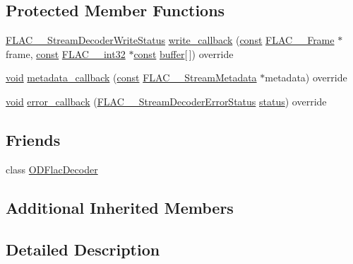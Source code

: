 \subsection*{Protected Member Functions}
\begin{DoxyCompactItemize}
\item 
\hyperlink{group__flac__stream__decoder_ga73f67eb9e0ab57945afe038751bc62c8}{F\+L\+A\+C\+\_\+\+\_\+\+Stream\+Decoder\+Write\+Status} \hyperlink{class_o_d_f_l_a_c_file_a0b7eb5afc2015504a9f57e60b9a57c54}{write\+\_\+callback} (\hyperlink{getopt1_8c_a2c212835823e3c54a8ab6d95c652660e}{const} \hyperlink{struct_f_l_a_c_____frame}{F\+L\+A\+C\+\_\+\+\_\+\+Frame} $\ast$frame, \hyperlink{getopt1_8c_a2c212835823e3c54a8ab6d95c652660e}{const} \hyperlink{ordinals_8h_a33fd77bfe6d685541a0c034a75deccdc}{F\+L\+A\+C\+\_\+\+\_\+int32} $\ast$\hyperlink{getopt1_8c_a2c212835823e3c54a8ab6d95c652660e}{const} \hyperlink{structbuffer}{buffer}\mbox{[}$\,$\mbox{]}) override
\item 
\hyperlink{sound_8c_ae35f5844602719cf66324f4de2a658b3}{void} \hyperlink{class_o_d_f_l_a_c_file_aeb1d1c6a1d3e8ffaf7f91eadd9b3445a}{metadata\+\_\+callback} (\hyperlink{getopt1_8c_a2c212835823e3c54a8ab6d95c652660e}{const} \hyperlink{struct_f_l_a_c_____stream_metadata}{F\+L\+A\+C\+\_\+\+\_\+\+Stream\+Metadata} $\ast$metadata) override
\item 
\hyperlink{sound_8c_ae35f5844602719cf66324f4de2a658b3}{void} \hyperlink{class_o_d_f_l_a_c_file_ae9691750596a13e9a325775612ddb8b6}{error\+\_\+callback} (\hyperlink{group__flac__stream__decoder_ga130e70bd9a73d3c2416247a3e5132ecf}{F\+L\+A\+C\+\_\+\+\_\+\+Stream\+Decoder\+Error\+Status} \hyperlink{rfft2d_test_m_l_8m_a1b5437a866e6f95107b07ba845bc1800}{status}) override
\end{DoxyCompactItemize}
\subsection*{Friends}
\begin{DoxyCompactItemize}
\item 
class \hyperlink{class_o_d_f_l_a_c_file_a243cdb08a04e6c5af869b3b3ca2830c0}{O\+D\+Flac\+Decoder}
\end{DoxyCompactItemize}
\subsection*{Additional Inherited Members}


\subsection{Detailed Description}


